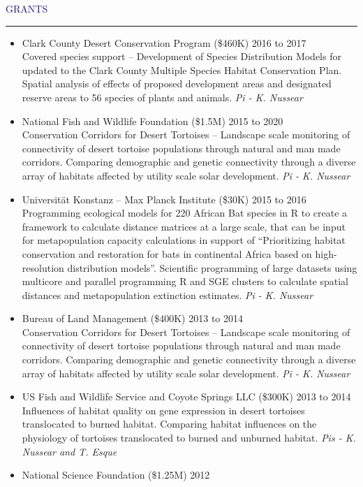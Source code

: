 \documentclass{resume} %
\renewenvironment{rSection}[1]{
\sectionskip
\textcolor{MidnightBlue}{\MakeUppercase{#1}}
\sectionlineskip
\hrule
\begin{list}{}{
\setlength{\leftmargin}{1.5em}
}
\item[]
}{
\end{list}
}
\begin{document}
\begin{rSection}{Grants}{}
\begin{itemize}
\item Clark County Desert Conservation Program (\$460K) \hfill 2016 to 2017 \\
Covered species support -- Development of Species Distribution Models for updated to the Clark County Multiple Species Habitat Conservation Plan. Spatial analysis of effects of proposed development areas and designated reserve areas to 56 species of plants and animals. \textit{Pi - K. Nussear}
\item National Fish and Wildlife Foundation (\$1.5M) \hfill 2015 to 2020 \\ 
Conservation Corridors for Desert Tortoises -- Landscape scale monitoring of connectivity of desert tortoise populations through natural and man made corridors. Comparing demographic and genetic connectivity through a diverse array of habitats affected by utility scale solar development. \textit{Pi - K. Nussear}
\item Universität Konstanz -- Max Planck Institute (\$30K) \hfill 2015 to 2016 \\ 
Programming ecological models for 220 African Bat species in R to create a framework to calculate distance matrices at a large scale, that can be input for metapopulation capacity calculations in support of “Prioritizing habitat conservation and restoration for bats in continental Africa based on high-resolution distribution models”. Scientific programming of large datasets using multicore and parallel programming R and SGE clusters to calculate spatial distances and metapopulation extinction estimates. \textit{Pi - K. Nussear}
\item Bureau of Land Management (\$400K) \hfill 2013 to 2014  \\ 
Conservation Corridors for Desert Tortoises – Landscape scale monitoring of connectivity of desert tortoise populations through natural and man made corridors. Comparing demographic and genetic connectivity through a diverse array of habitats affected by utility scale solar development. \textit{Pi - K. Nussear}
\item US Fish and Wildlife Service and Coyote Springs LLC (\$300K) \hfill 2013 to 2014 \\ Influences of habitat quality on gene expression in desert tortoises translocated to burned habitat. Comparing habitat influences on the physiology of tortoises translocated to burned and unburned habitat. \textit{Pis - K. Nussear and T. Esque}
\item National Science Foundation (\$1.25M) \hfill 2012 \\ 

\end{itemize}
\end{rSection}
\end{document}

